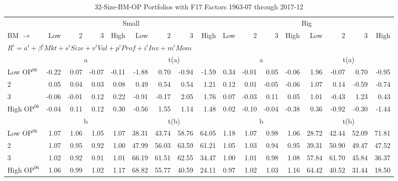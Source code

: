 
\begin{table}[!ht]
\footnotesize
\centering
\caption{32-Size-BM-OP Portfolios with F17 Factors 1963-07 through 2017-12}
\begin{tabular}{lrrrrrrrrrrrrrrrr}
  \toprule
     & \multicolumn{8}{c}{Small} & \multicolumn{8}{c}{Big}  \\
     \cmidrule(r){2-9} \cmidrule(r){10-17}
    BM $\rightarrow$ & Low & 2 & 3 & High & Low & 2 & 3 & High & Low & 2 & 3 & High & Low & 2 & 3 & High  \\ 
  \midrule
  \multicolumn{17}{l}{$R^i=a^i+\beta^iMkt+s^iSize+v^iVal+p^iProf+i^iInv+m^iMom$}  \\
  
     & \multicolumn{4}{c}{a} & \multicolumn{4}{c}{t(a)}  & \multicolumn{4}{c}{a} & \multicolumn{4}{c}{t(a)}   \\
     \cmidrule(r){2-5} \cmidrule(r){6-9}  \cmidrule(r){10-13} \cmidrule(r){14-17} 
    Low $\text{OP}^{06}$  & -0.22  & 0.07  & -0.07  & -0.11  & -1.88  & 0.70  & -0.94  & -1.59  & 0.34  & -0.01  & 0.05  & -0.06  & 1.96  & -0.07  & 0.70  & -0.95   \\
    2  & 0.05  & 0.04  & 0.03  & 0.08  & 0.49  & 0.54  & 0.54  & 1.21  & 0.12  & 0.01  & -0.05  & -0.06  & 1.07  & 0.14  & -0.59  & -0.74   \\
    3  & -0.06  & -0.01  & 0.12  & 0.22  & -0.91  & -0.17  & 2.05  & 1.76  & 0.07  & -0.03  & 0.11  & 0.05  & 1.01  & -0.43  & 1.23  & 0.43   \\
    High $\text{OP}^{06}$  & -0.04  & 0.11  & 0.12  & 0.30  & -0.56  & 1.55  & 1.14  & 1.48  & 0.02  & -0.10  & -0.04  & -0.38  & 0.36  & -0.92  & -0.30  & -1.44   \\
    
  
     & \multicolumn{4}{c}{b} & \multicolumn{4}{c}{t(b)}  & \multicolumn{4}{c}{b} & \multicolumn{4}{c}{t(b)}   \\
     \cmidrule(r){2-5} \cmidrule(r){6-9}  \cmidrule(r){10-13} \cmidrule(r){14-17} 
    Low $\text{OP}^{06}$  & 1.07  & 1.06  & 1.05  & 1.07  & 38.31  & 43.74  & 58.76  & 64.05  & 1.18  & 1.07  & 0.98  & 1.06  & 28.72  & 42.44  & 52.09  & 71.81   \\
    2  & 1.07  & 0.95  & 0.92  & 1.00  & 47.99  & 56.03  & 63.59  & 61.21  & 1.05  & 1.03  & 0.94  & 0.95  & 39.31  & 50.90  & 49.47  & 47.52   \\
    3  & 1.02  & 0.92  & 0.91  & 1.01  & 66.19  & 61.51  & 62.55  & 34.47  & 1.00  & 1.01  & 0.98  & 1.08  & 57.84  & 61.70  & 45.84  & 36.37   \\
    High $\text{OP}^{06}$  & 1.06  & 0.99  & 1.02  & 1.17  & 68.82  & 55.77  & 40.59  & 24.11  & 0.97  & 1.02  & 1.03  & 1.16  & 64.42  & 40.52  & 31.44  & 18.50   \\
    

\end{tabular}
\end{table}
